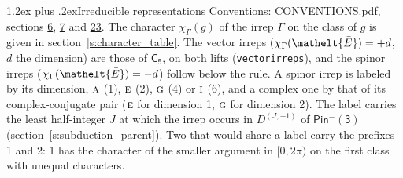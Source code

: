 \documentclass[10pt,a4paper]{article}
\makeatletter
\renewcommand\section{\@startsection{section}{1}{\z@}{-3ex plus -1ex minus -.2ex}%
  {1.2ex plus .2ex}{\normalfont\large\sffamily\bfseries\color{parttitle}}}
\numberwithin{equation}{section}
\newcommand{\eltfont}[1]{{\let\sigma\eltsigma\mathelt{#1}}}
\newcommand{\grp}[1]{\mathsf{#1}}
\newcommand{\irr}[1]{\text{\normalfont\scshape #1}}
\newcommand{\elt}[1]{\eltfont{#1}}
\newcommand{\irrJp}[2]{D^{(#1,#2)}}
\newcommand{\irchar}[1]{\chi_{#1}}
\newcommand{\barred}[1]{\bar{#1}}
\makeatother
\begin{document}
\section{Irreducible representations}\label{s:irreps}
Conventions: \href{../../CONVENTIONS.pdf}{CONVENTIONS.pdf}, sections \href{../../../rotation/CONVENTIONS.pdf\#conv.6}{6}, \href{../../../rotation/CONVENTIONS.pdf\#conv.7}{7} and \href{../../CONVENTIONS.pdf\#conv.23}{23}.
\leavevmode\label{n:function.character}\label{n:irrep.Gamma}The character $\irchar{\Gamma}(g)$ of the irrep $\Gamma$ on the class of $g$ is given in section~\ref{s:character_table}. \label{n:index.dimension}The vector irreps ($\irchar{\Gamma}(\elt{\barred{E}}) = +d$, $d$ the dimension) are those of \href{../../../rotation/data/pdf/C5.pdf}{$\grp{C_{5}}$}, on both lifts (\texttt{vectorirreps}), and the spinor irreps ($\irchar{\Gamma}(\elt{\barred{E}}) = -d$) follow below the rule. A spinor irrep is labeled by its dimension, $\irr{a}$ (1), $\irr{e}$ (2), $\irr{g}$ (4) or $\irr{i}$ (6), and a complex one by that of its complex-conjugate pair ($\irr{e}$ for dimension 1, $\irr{g}$ for dimension 2). The label carries the least half-integer $J$ at which the irrep occurs in $\irrJp{J}{+1}$ of $\grp{Pin^{-}(3)}$ (section~\ref{s:subduction_parent}). Two that would share a label carry the prefixes 1 and 2: 1 has the character of the smaller argument in $[0, 2\pi)$ on the first class with unequal characters.
\end{document}

